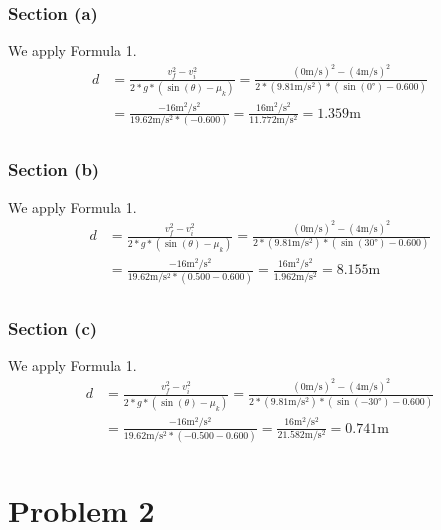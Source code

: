 \documentclass[12pt]{article}
\begin{document}
\subsubsection*{Section (a)}
We apply Formula 1.
\begin{align*}
    d   &=  \frac{v_f^2 - v_i^2}{2*g*(\sin(\theta)-\mu_k)}
        =   \frac{(0\unit{\meter/\second})^2 - (4\unit{\meter/\second})^2}{2*(9.81\unit{\meter/\second^2})*(\sin(0\unit{\degree})-0.600)}\\
        &=  \frac{ - 16\unit{\meter^2/\second^2}}{19.62\unit{\meter/\second^2}*(-0.600)}
        =   \frac{16\unit{\meter^2/\second^2}}{11.772\unit{\meter/\second^2}}
        =   \boxed{1.359\unit{\meter}}\\
\end{align*}

\subsubsection*{Section (b)}
We apply Formula 1.
\begin{align*}
    d   &=  \frac{v_f^2 - v_i^2}{2*g*(\sin(\theta)-\mu_k)}
        =   \frac{(0\unit{\meter/\second})^2 - (4\unit{\meter/\second})^2}{2*(9.81\unit{\meter/\second^2})*(\sin(30\unit{\degree})-0.600)}\\
        &=  \frac{ - 16\unit{\meter^2/\second^2}}{19.62\unit{\meter/\second^2}*(0.500-0.600)}
        =   \frac{16\unit{\meter^2/\second^2}}{1.962\unit{\meter/\second^2}}
        =   \boxed{8.155\unit{\meter}}\\
\end{align*}

\subsubsection*{Section (c)}
We apply Formula 1.
\begin{align*}
    d   &=  \frac{v_f^2 - v_i^2}{2*g*(\sin(\theta)-\mu_k)}
        =   \frac{(0\unit{\meter/\second})^2 - (4\unit{\meter/\second})^2}{2*(9.81\unit{\meter/\second^2})*(\sin(-30\unit{\degree})-0.600)}\\
        &=  \frac{ - 16\unit{\meter^2/\second^2}}{19.62\unit{\meter/\second^2}*(-0.500-0.600)}
        =   \frac{16\unit{\meter^2/\second^2}}{21.582\unit{\meter/\second^2}}
        =   \boxed{0.741\unit{\meter}}\\
\end{align*}

\pagebreak
\section*{Problem 2}
\end{document}

